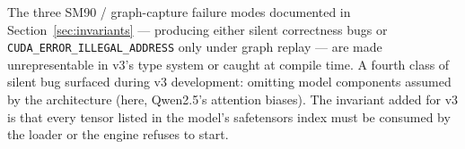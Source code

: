 The three SM90 / graph-capture failure modes documented in
Section~\ref{sec:invariants} --- producing either silent correctness bugs
or \texttt{CUDA\_ERROR\_ILLEGAL\_ADDRESS} only under graph replay --- are
made unrepresentable in v3's type system or caught at compile time.
A fourth class of silent bug surfaced during v3 development: omitting
model components assumed by the architecture (here, Qwen2.5's attention
biases). The invariant added for v3 is that every tensor listed in the
model's safetensors index must be consumed by the loader or the engine
refuses to start.



